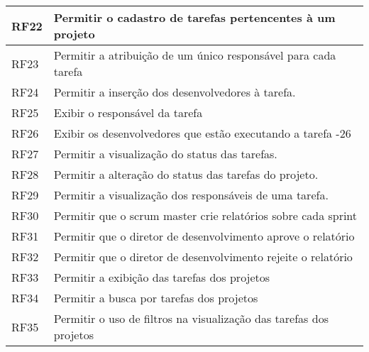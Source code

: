 \begin{table}[]
\begin{tabular}{|l|l|}
RF22 & Permitir o cadastro de tarefas pertencentes à um projeto                                                                                              \\ \hline
RF23 & Permitir a atribuição de um único responsável para cada tarefa                                                                                        \\ \hline
RF24 & Permitir a inserção dos desenvolvedores à tarefa.                                                                                                     \\ \hline
RF25 & Exibir o responsável da tarefa                                                                                                                        \\ \hline
RF26 & Exibir os desenvolvedores que estão executando a tarefa -26                                                                                           \\ \hline
RF27 & Permitir a visualização do status das tarefas.                                                                                                        \\ \hline
RF28 & Permitir a alteração do status das tarefas do projeto.                                                                                                \\ \hline
RF29 & Permitir a visualização dos responsáveis de uma tarefa.                                                                                               \\ \hline
RF30 & Permitir que o scrum master crie relatórios sobre cada sprint                                                                                         \\ \hline
RF31 & Permitir que o diretor de desenvolvimento aprove o relatório                                                                                          \\ \hline
RF32 & Permitir que o diretor de desenvolvimento rejeite o relatório                                                                                         \\ \hline
RF33 & Permitir a exibição das tarefas dos projetos                                                                                                          \\ \hline
RF34 & Permitir a busca por tarefas dos projetos                                                                                                             \\ \hline
RF35 & Permitir o uso de filtros na visualização das tarefas dos projetos                                                                                    \\ \hline
\end{tabular}
\end{table}

